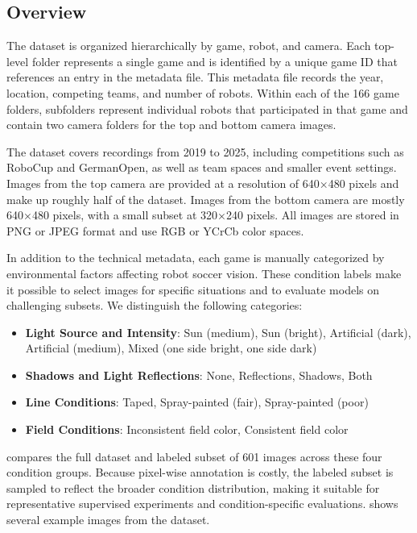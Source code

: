\documentclass[a4paper, runningheads, orivec]{llncs}
\begin{document}
\subsection{Overview}

The dataset is organized hierarchically by game, robot, and camera.
Each top-level folder represents a single game and is identified by a unique game ID that references an entry in the metadata file.
This metadata file records the year, location, competing teams, and number of robots.
Within each of the 166 game folders, subfolders represent individual robots that participated in that game and contain two camera folders for the top and bottom camera images.

The dataset covers recordings from 2019 to 2025, including competitions such as RoboCup and GermanOpen, as well as team spaces and smaller event settings.
Images from the top camera are provided at a resolution of 640×480 pixels and make up roughly half of the dataset.
Images from the bottom camera are mostly 640×480 pixels, with a small subset at 320×240 pixels.
All images are stored in PNG or JPEG format and use RGB or YCrCb color spaces.

In addition to the technical metadata, each game is manually categorized by environmental factors affecting robot soccer vision.
These condition labels make it possible to select images for specific situations and to evaluate models on challenging subsets.
We distinguish the following categories:

\begin{itemize}
	\item \textbf{Light Source and Intensity}: Sun (medium), Sun (bright), Artificial (dark), Artificial (medium), Mixed (one side bright, one side dark)
	\item \textbf{Shadows and Light Reflections}: None, Reflections, Shadows, Both
	\item \textbf{Line Conditions}: Taped, Spray-painted (fair), Spray-painted (poor)
	\item \textbf{Field Conditions}: Inconsistent field color, Consistent field color
\end{itemize}

 compares the full dataset and labeled subset of 601 images across these four condition groups.
Because pixel-wise annotation is costly, the labeled subset is sampled to reflect the broader condition distribution, making it suitable for representative supervised experiments and condition-specific evaluations.
 shows several example images from the dataset.
\end{document}
